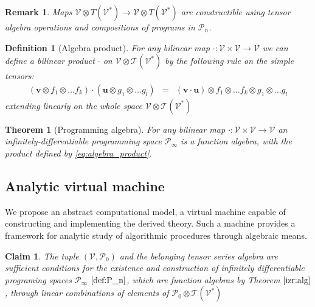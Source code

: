\documentclass[smallcondensed]{svjour3}
\newcommand{\T}{\mathcal{T}}
\newcommand{\VV}{\mathcal{V}}
\newcommand{\uu}{\mathbf{u}}
\newcommand{\vv}{\mathbf{v}}
\newcommand{\dP}{\mathcal{P}}
\newtheorem{definicija}{Definition}[section]
\newtheorem{trditev}{Claim}[section]
\newtheorem{izrek}{Theorem}[section]
\newtheorem{opomba}{Remark}[section]
\begin{document}
       \begin{opomba}\label{rem:vTen}
       Maps $\VV\otimes T(\VV^*)\to \VV\otimes T(\VV^*)$ are constructible using
       tensor algebra operations and compositions of programs in $\dP_n$.
       \end{opomba}
       
 

\begin{definicija}[Algebra product]
 For any bilinear map $\cdot :\VV\times \VV\to \VV$ we can define a
 bilinear product $\cdot$ on $\VV\otimes \T(\VV^*)$ by the following rule on the
 simple tensors:
 \begin{eqnarray}
   \label{eq:algebra_product}
   (\vv\otimes f_1\otimes\ldots f_k) \cdot (\uu\otimes g_1\otimes\ldots g_l) &=& 
(\vv\cdot \uu)\otimes f_1\otimes\ldots f_k\otimes g_1\otimes\ldots g_l 
 \end{eqnarray}
extending linearly on the whole space $\VV\otimes\T(\VV^*)$
\end{definicija}
\begin{izrek}[Programming algebra]\label{izr:alg}
 For any bilinear map $\cdot :\VV\times \VV\to \VV$ an infinitely-differentiable
 programming space $\dP_\infty$ is a function algebra, with the product defined
 by \eqref{eq:algebra_product}.
\end{izrek}

\subsection{Analytic virtual machine}

We propose an abstract computational model, a virtual machine capable of constructing and implementing the derived theory. Such a machine provides a framework for analytic study of algorithmic procedures through algebraic means.

\begin{trditev}
The tuple  $(\VV,\dP_0)$ and the belonging \emph{tensor series algebra} are sufficient conditions for the existence and construction of \emph{infinitely differentiable programing spaces} $\dP_\infty$ $\eqref{def:P_n}$, which are \emph{function algebras} by Theorem $\ref{izr:alg}$, through linear combinations of elements of $\dP_0\otimes \T(\VV^*)$
\end{trditev}
\end{document}
